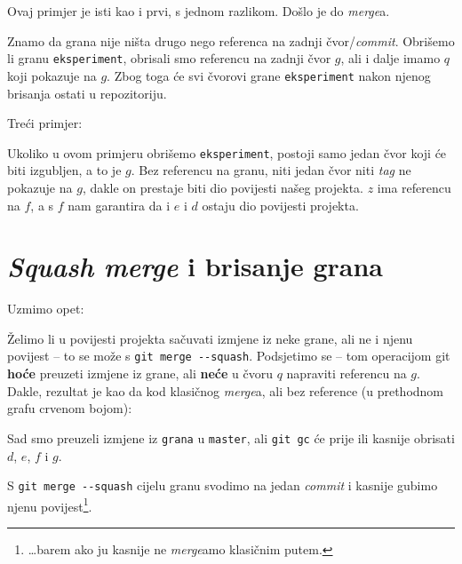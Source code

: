 Ovaj primjer je isti kao i prvi, s jednom razlikom. 
Došlo je do \emph{merge}a.

Znamo da grana nije ništa drugo nego referenca na zadnji čvor/\emph{commit}.
Obrišemo li granu \verb+eksperiment+, obrisali smo referencu na zadnji čvor $g$, ali i dalje imamo $q$ koji pokazuje na $g$.
Zbog toga će svi čvorovi grane \verb+eksperiment+ nakon njenog brisanja ostati u repozitoriju.

Treći primjer:



Ukoliko u ovom primjeru obrišemo \verb+eksperiment+, postoji samo jedan čvor koji će biti izgubljen, a to je $g$.
Bez referencu na granu, niti jedan čvor niti \emph{tag} ne pokazuje na $g$, dakle on prestaje biti dio povijesti našeg projekta.
$z$ ima referencu na $f$, a s $f$ nam garantira da i $e$ i $d$ ostaju dio povijesti projekta.

\section*{\emph{Squash merge} i brisanje grana}

Uzmimo opet:



Želimo li u povijesti projekta sačuvati izmjene iz neke grane, ali ne i njenu povijest -- to se može s \verb+git merge --squash+.
Podsjetimo se -- tom operacijom git \textbf{hoće} preuzeti izmjene iz grane, ali \textbf{neće} u čvoru $q$ napraviti referencu na $g$.
Dakle, rezultat je kao da kod klasičnog \emph{merge}a, ali bez reference (u prethodnom grafu crvenom bojom):



Sad smo preuzeli izmjene iz \verb+grana+ u \verb+master+, ali \verb+git gc+ će prije ili kasnije obrisati $d$, $e$, $f$ i $g$.

S \verb+git merge --squash+ cijelu granu svodimo na jedan \emph{commit} i kasnije gubimo njenu povijest\footnote{\dots{}barem ako ju kasnije ne \emph{merge}amo klasičnim putem.}.
